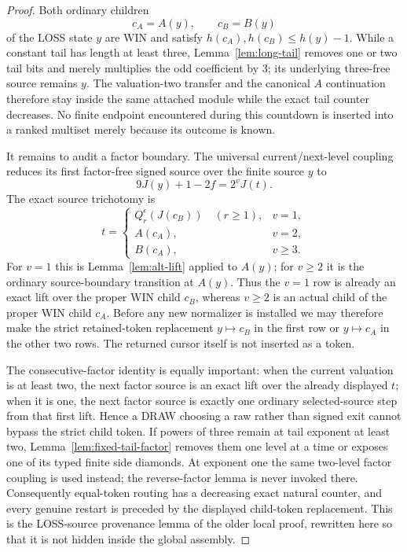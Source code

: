 \documentclass[11pt]{article}
\begin{document}
\begin{proof}
Both ordinary children
\[
 c_A=A(y),\qquad c_B=B(y)
\]
of the LOSS state $y$ are WIN and satisfy
$h(c_A),h(c_B)\le h(y)-1$.  While a constant tail has length at least three,
Lemma~\ref{lem:long-tail} removes one or two tail bits and merely multiplies
the odd coefficient by $3$; its underlying three-free source remains $y$.
The valuation-two transfer and the canonical $A$ continuation therefore stay
inside the same attached module while the exact tail counter decreases.  No
finite endpoint encountered during this countdown is inserted into a ranked
multiset merely because its outcome is known.

It remains to audit a factor boundary.  The universal current/next-level
coupling reduces its first factor-free signed source over the finite source
$y$ to
\[
 9J(y)+1-2f=2^vJ(t).
\]
The exact source trichotomy is
\[
 t=\begin{cases}
   Q_r^\epsilon(J(c_B))\quad(r\ge1),&v=1,\\
   A(c_A),&v=2,\\
   B(c_A),&v\ge3.
  \end{cases}
\]
For $v=1$ this is Lemma~\ref{lem:alt-lift} applied to $A(y)$; for
$v\ge2$ it is the ordinary source-boundary transition at $A(y)$.  Thus the
$v=1$ row is already an exact lift over the proper WIN child $c_B$, whereas
$v\ge2$ is an actual child of the proper WIN child $c_A$.  Before any new
normalizer is installed we may therefore make the strict retained-token
replacement $y\mapsto c_B$ in the first row or $y\mapsto c_A$ in the other
two rows.  The returned cursor itself is not inserted as a token.

The consecutive-factor identity is equally important: when the current
valuation is at least two, the next factor source is an exact lift over the
already displayed $t$; when it is one, the next factor source is exactly one
ordinary selected-source step from that first lift.  Hence a DRAW choosing a
raw rather than signed exit cannot bypass the strict child token.  If powers
of three remain at tail exponent at least two,
Lemma~\ref{lem:fixed-tail-factor} removes them one level at a time or exposes
one of its typed finite side diamonds.  At exponent one the same two-level
factor coupling is used instead; the reverse-factor lemma is never invoked
there.  Consequently equal-token routing has a decreasing exact natural
counter, and every genuine restart is preceded by the displayed child-token
replacement.  This is the LOSS-source provenance lemma of the older local
proof, rewritten here so that it is not hidden inside the global assembly.
\end{proof}
\end{document}
